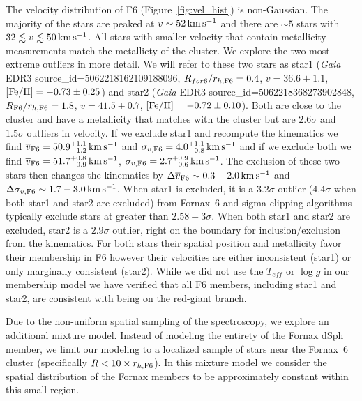 \documentclass[twocolumn]{aastex63}
\begin{document}
The velocity distribution of F6 (Figure~\ref{fig:vel_hist}) is non-Gaussian.  The majority of the stars are peaked at $v\sim52\mathrm{\,km} \mathrm{\,s}^{-1}$ and there are $\sim5$ stars with $32 \lesssim v \lesssim 50 \mathrm{\,km} \mathrm{\,s}^{-1}$.  All stars with smaller velocity that contain metallicity measurements match the metallicty of the cluster.
We explore the two most extreme outliers in more detail.
We will refer to these two stars as star1 ({\it Gaia} EDR3 source\_id=5062218162109188096, 
$R_{for6}/r_{ h, {\rm F6}}=0.4$, $v=36.6\pm1.1$, ${\rm [Fe/H]}=-0.73\pm0.25$) and star2 ({\it Gaia} EDR3 source\_id=5062218368273902848, $R_{\rm F6}/r_{ h, {\rm F6}}=1.8$, $v=41.5\pm0.7$, ${\rm [Fe/H]}=-0.72\pm0.10$).
Both are close to the cluster and have a metallicity that matches with the cluster but are $2.6\sigma$ and $1.5\sigma$ outliers in velocity. 
If we exclude star1 and recompute the kinematics we find $\overline{v}_{\rm F6} = 50.9_{-1.2}^{+1.1} \mathrm{\,km} \mathrm{\,s}^{-1}$ and
$\sigma_{v, {\rm F6}} = 4.0_{-0.8}^{+1.1} \mathrm{\,km} \mathrm{\,s}^{-1}$ and if we exclude both we find $\overline{v}_{\rm F6} = 51.7_{-0.9}^{+0.8} \mathrm{\,km} \mathrm{\,s}^{-1}$,
$\sigma_{v, {\rm F6}} = 2.7_{-0.6}^{+0.9} \mathrm{\,km} \mathrm{\,s}^{-1}$.
The exclusion of these two stars then changes the  kinematics by $\Delta \overline{v}_{\rm F6}\sim 0.3-2.0 \mathrm{\,km} \mathrm{\,s}^{-1}$ and $\Delta \sigma_{v, {\rm F6}} \sim 1.7-3.0 \mathrm{\,km} \mathrm{\,s}^{-1}$. 
When star1 is excluded, it is a $3.2\sigma$ outlier ($4.4\sigma$ when both star1 and star2 are excluded) from Fornax~6 and sigma-clipping algorithms typically exclude stars at greater than $2.58-3\sigma$.  
When both star1 and star2 are excluded, star2 is a $2.9\sigma$ outlier, right on the boundary for inclusion/exclusion from the kinematics.  
For both stars their spatial position and metallicity  favor their membership in F6 however their velocities are either inconsistent (star1) or only marginally consistent (star2).
While we did not use the $T_{eff}$ or $\log{g}$ in our membership model we have verified that all F6 members, including star1 and star2, are consistent with being on the red-giant branch.  


Due to the non-uniform spatial sampling of the spectroscopy, we explore an additional mixture model.
Instead of modeling the entirety of the Fornax dSph member, we limit our modeling to a localized sample of stars near the Fornax~6 cluster (specifically $R<10\times r_{h, {\rm F6}}$).
In this mixture model we consider the spatial distribution of the Fornax members to be approximately constant within this small region.
\end{document}
